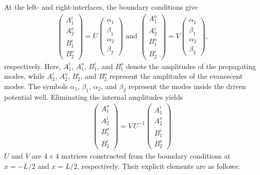 \documentclass[aps,prb,onecolumn,longbibliography,nofootinbib,citeautoscript,10pt]{revtex4-2}
\begin{document}
At the left- and right-interfaces, the boundary conditions give
\begin{align}
\begin{pmatrix}
A_1^i \\ A_2^o \\ B_1^i \\ B_2^o \end{pmatrix} = U \begin{pmatrix}
\alpha_1 \\\beta_1 \\ \alpha_2 \\
\beta_2 \end{pmatrix} \text{ and }
\begin{pmatrix} A_1^o \\ A_2^i \\ B_1^o \\ B_2^i
\end{pmatrix} = V \begin{pmatrix}
\alpha_1 \\ \beta_1 \\ \alpha_2 \\
\beta_2 \end{pmatrix} , 
\end{align}
respectively. Here, $A_1^i$, $ A_1^o$, $ B_1^i$, and $ B_1^o$ denote the amplitudes of the propagating modes, while $A_2^i$, $ A_2^o$, $ B_2^i$, and $ B_2^o$ represent the amplitudes of the evanescent modes. The symbols $\alpha_1$, $\beta_1$, $\alpha_2$, and $ \beta_2$ represent the modes inside the driven potential well. Eliminating the internal amplitudes yields
\begin{align}
\begin{pmatrix} A_1^o \\ A_2^i \\ B_1^o \\ B_2^i \end{pmatrix}
=V \,U^{-1}\begin{pmatrix}
A_1^i \\ A_2^o \\ B_1^i \\ B_2^o
\end{pmatrix}.
\end{align}
$U$ and $V$ are $4\times 4$ matrices constructed from the boundary conditions at $x=-L/2$ and $x=L/2$, respectively. Their explicit elements are as follows:
\end{document}
